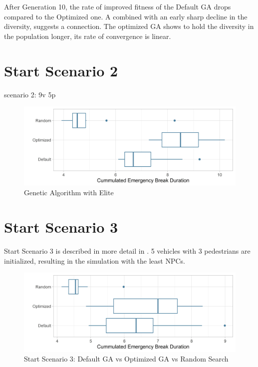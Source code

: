 After Generation 10, the rate of improved fitness of the Default GA drops compared to the Optimized one. A combined with an early sharp decline in the diversity, suggests a connection. The optimized GA shows to hold the diversity in the population longer, its rate of convergence is linear.



\section{Start Scenario 2}
scenario 2: 9v 5p
\begin{figure}[ht] 
	\label{figure:sim_2_comparison}
	\includegraphics[width=1\linewidth]{simulations/evaluation/plots/sim_1_comparison}
	\caption{Genetic Algorithm with Elite}
\end{figure}


\section{Start Scenario 3}
Start Scenario 3 is described in more detail in . 5 vehicles with 3 pedestrians are initialized, resulting in the simulation with the least NPCs.








\begin{figure}[ht] 
	\label{figure:sim_3_comparison}
	\includegraphics[width=1\linewidth]{simulations/evaluation/plots/sim_3_comparison}
	\caption{Start Scenario 3: Default GA vs Optimized GA vs Random Search}
\end{figure}

